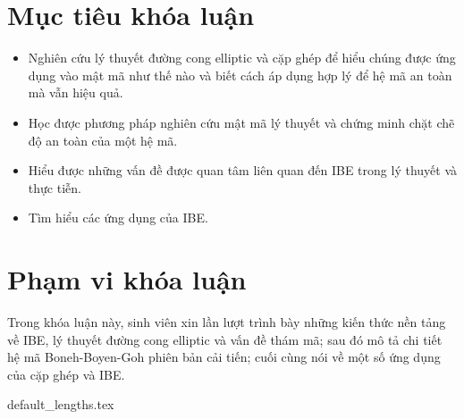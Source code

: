 \documentclass[class=report, crop=false]{standalone}
\begin{document}
	\section{Mục tiêu khóa luận}
		\begin{itemize}
			\item Nghiên cứu lý thuyết đường cong elliptic và cặp ghép để hiểu chúng được ứng dụng vào mật mã như thế nào và biết cách áp dụng hợp lý để hệ mã an toàn mà vẫn hiệu quả.
			\item Học được phương pháp nghiên cứu mật mã lý thuyết và chứng minh chặt chẽ độ an toàn của một hệ mã.
			\item Hiểu được những vấn đề được quan tâm liên quan đến IBE trong lý thuyết và thực tiễn.
			\item Tìm hiểu các ứng dụng của IBE.
		\end{itemize}
	\section{Phạm vi khóa luận}
		Trong khóa luận này, sinh viên xin lần lượt trình bày những kiến thức nền tảng về IBE, lý thuyết đường cong elliptic và vấn đề thám mã; sau đó mô tả chi tiết hệ mã Boneh-Boyen-Goh phiên bản cải tiến; cuối cùng nói về một số ứng dụng của cặp ghép và IBE.

	\newpage
	{default_lengths.tex}
\end{document}
